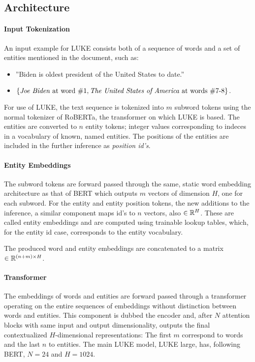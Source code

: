 \documentclass[main.tex]{subfiles}
\begin{document}
\subsection{Architecture}

\paragraph{Input Tokenization}
An input example for LUKE consists both of a sequence of words and a set of entities mentioned in the document, such as:
\begin{itemize}
    \item ''Biden is oldest president of the United States to date.''
    \item $\{\text{\emph{Joe Biden} at word \#1}, \text{\emph{The United States of America} at words \#7-8}\}$.
\end{itemize}
For use of LUKE, the text sequence is tokenized into $m$ subword tokens using the normal tokenizer of RoBERTa, the transformer on which LUKE is based.
The entities are converted to $n$ entity tokens; integer values corresponding to indeces in a vocabulary of known, named entities.
The positions of the entities are included in the further inference as \emph{position id's}.

\paragraph{Entity Embeddings}
The subword tokens are forward passed through the same, static word embedding architecture as that of BERT which outputs $m$ vectors of dimension $H$, one for each subword.
For the entity and entity position tokens, the new additions to the inference, a similar component maps id's to $n$ vectors, also $\in \mathbb R^H$.
These are called entity embeddings and are computed using trainable lookup tables, which, for the entity id case, corresponds to the entity vocabulary.

The produced word and entity embeddings are concatenated to a matrix $\in \mathbb R^{(n+m)\times H}$.

\paragraph{Transformer}
The embeddings of words and entities are forward passed through a transformer operating on the entire sequences of embeddings without distinction between words and entities.
This component is dubbed the encoder and, after $N$ attention blocks with same input and output dimensionality, outputs the final contextualized $H$-dimensional representations:
The first $m$ correspond to words and the last $n$ to entities.
The main LUKE model, LUKE large, has, following BERT, $N=24$ and $H=1024$.
\end{document}
